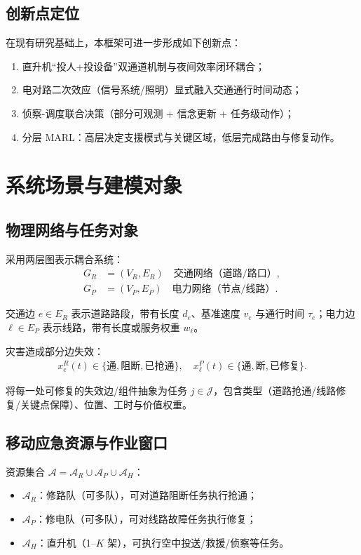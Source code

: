 \documentclass[UTF8,zihao=-4,a4paper,fontset=fandol]{ctexrep}
\begin{document}
\section{创新点定位}
在现有研究基础上，本框架可进一步形成如下创新点：
\begin{enumerate}[leftmargin=2em]
  \item 直升机“投人+投设备”双通道机制与夜间效率闭环耦合；
  \item 电对路二次效应（信号系统/照明）显式融入交通通行时间动态；
  \item 侦察-调度联合决策（部分可观测 + 信念更新 + 任务级动作）；
  \item 分层 MARL：高层决定支援模式与关键区域，低层完成路由与修复动作。
\end{enumerate}

\chapter{系统场景与建模对象}\label{ch:system}
\section{物理网络与任务对象}
采用两层图表示耦合系统：
\begin{align}
  G_R &= (V_R, E_R) \quad \text{交通网络（道路/路口）},\\
  G_P &= (V_P, E_P) \quad \text{电力网络（节点/线路）}. 
\end{align}

交通边 $e\in E_R$ 表示道路路段，带有长度 $d_e$、基准速度 $v_e$ 与通行时间 $\tau_e$；电力边 $\ell\in E_P$ 表示线路，带有长度或服务权重 $w_\ell$。

灾害造成部分边失效：
\begin{align}
  x^R_e(t) \in \{\text{通},\text{阻断},\text{已抢通}\},\quad
  x^P_\ell(t) \in \{\text{通},\text{断},\text{已修复}\}.
\end{align}

将每一处可修复的失效边/组件抽象为任务 $j\in\mathcal{J}$，包含类型（道路抢通/线路修复/关键点保障）、位置、工时与价值权重。

\section{移动应急资源与作业窗口}
资源集合 $\mathcal{A}=\mathcal{A}_R\cup\mathcal{A}_P\cup\mathcal{A}_H$：
\begin{itemize}[leftmargin=2em]
  \item $\mathcal{A}_R$：修路队（可多队），可对道路阻断任务执行抢通；
  \item $\mathcal{A}_P$：修电队（可多队），可对线路故障任务执行修复；
  \item $\mathcal{A}_H$：直升机（1--$K$ 架），可执行空中投送/救援/侦察等任务。
\end{itemize}
\end{document}
